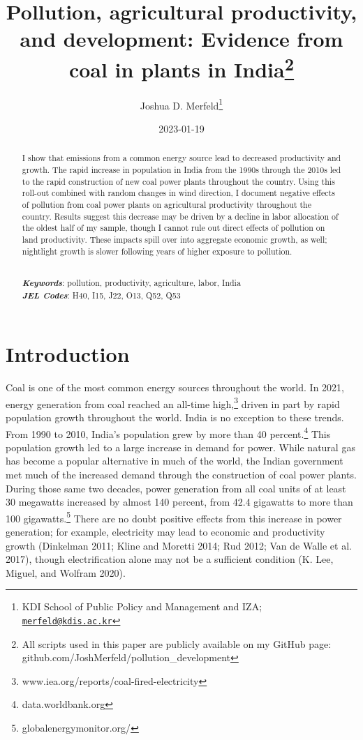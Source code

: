 \documentclass[
]{article}
\title{Pollution, agricultural productivity, and development: Evidence from coal in plants in India\footnote{All scripts used in this paper are publicly available on my GitHub page: github.com/JoshMerfeld/pollution\_development}}
\author{Joshua D. Merfeld\footnote{KDI School of Public Policy and Management and IZA; \href{mailto:merfeld@kdis.ac.kr}{\nolinkurl{merfeld@kdis.ac.kr}}}}
\date{2023-01-19}
\begin{document}
\maketitle
\begin{abstract}
\noindent I show that emissions from a common energy source lead to decreased productivity and growth. The rapid increase in population in India from the 1990s through the 2010s led to the rapid construction of new coal power plants throughout the country. Using this roll-out combined with random changes in wind direction, I document negative effects of pollution from coal power plants on agricultural productivity throughout the country. Results suggest this decrease may be driven by a decline in labor allocation of the oldest half of my sample, though I cannot rule out direct effects of pollution on land productivity. These impacts spill over into aggregate economic growth, as well; nightlight growth is slower following years of higher exposure to pollution.\\
\strut \\
\textbf{\textit{Keywords}}: pollution, productivity, agriculture, labor, India\\
\textbf{\textit{JEL Codes}}: H40, I15, J22, O13, Q52, Q53
\end{abstract}

\newpage
\doublespacing

\hypertarget{introduction}{%
\section{Introduction}\label{introduction}}

Coal is one of the most common energy sources throughout the world. In 2021, energy generation from coal reached an all-time high,\footnote{www.iea.org/reports/coal-fired-electricity} driven in part by rapid population growth throughout the world. India is no exception to these trends. From 1990 to 2010, India's population grew by more than 40 percent.\footnote{data.worldbank.org} This population growth led to a large increase in demand for power. While natural gas has become a popular alternative in much of the world, the Indian government met much of the increased demand through the construction of coal power plants. During those same two decades, power generation from all coal units of at least 30 megawatts increased by almost 140 percent, from 42.4 gigawatts to more than 100 gigawatts.\footnote{globalenergymonitor.org/} There are no doubt positive effects from this increase in power generation; for example, electricity may lead to economic and productivity growth (Dinkelman 2011; Kline and Moretti 2014; Rud 2012; Van de Walle et al. 2017), though electrification alone may not be a sufficient condition (K. Lee, Miguel, and Wolfram 2020).
\end{document}
